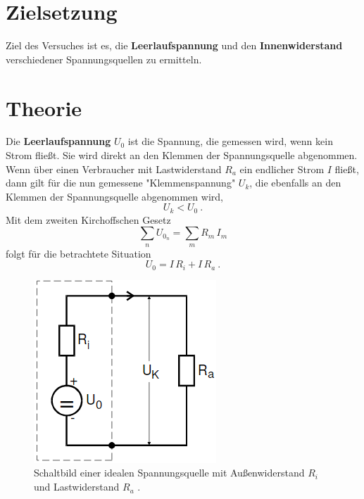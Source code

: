 \maketitle
\tableofcontents
\newpage

\section{Zielsetzung}
Ziel des Versuches ist es, die \textbf{Leerlaufspannung} und den \textbf{\textbf{Innenwiderstand}}
verschiedener Spannungsquellen zu ermitteln.
\section{Theorie}
Die \textbf{Leerlaufspannung} $U_0$ ist die Spannung, die gemessen wird, wenn kein Strom fließt.
Sie wird direkt an den Klemmen der Spannungsquelle abgenommen. Wenn über einen Verbraucher
mit Lastwiderstand $R_a$ ein endlicher Strom $I$ fließt, dann gilt für die nun gemessene
"Klemmenspannung" $U_k$, die ebenfalls an den Klemmen der Spannungsquelle abgenommen wird,
\begin{equation*}
    U_k < U_0 \ .
\end{equation*}
Mit dem zweiten Kirchoffschen Gesetz
\begin{equation}
  \sum_n U_{0_n} = \sum_m R_m \, I_m
  \label{eqn:4}
\end{equation}
folgt für die betrachtete Situation
\begin{equation}
    U_0 = I \, R_i + I \, R_a \ .
    \label{eqn:5}
\end{equation}
\begin{figure}[h]
  \centering
  \includegraphics[scale=0.7]{theorie.png}
  \caption{Schaltbild einer idealen Spannungsquelle mit Außenwiderstand $R_i$ und
  Lastwiderstand $R_a$ \cite{anleitung}.}
  \label{fig:1}
\end{figure}
